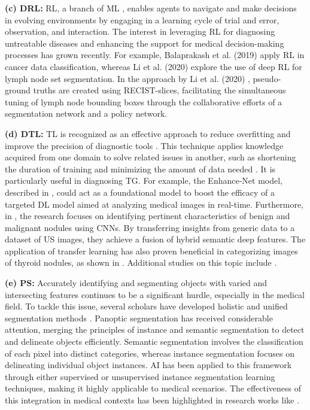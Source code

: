 \documentclass[a4paper,fleqn]{cas-sc}
\begin{document}
\vskip2mm
\noindent \textbf{(c) \Acf{DRL}: } \ac{RL}, a branch of \ac{ML} \cite{gueriani2023deep}, enables agents to navigate and make decisions in evolving environments by engaging in a learning cycle of trial and error, observation, and interaction. The interest in leveraging \ac{RL} for diagnosing untreatable diseases and enhancing the support for medical decision-making processes has grown recently. For example, Balaprakash et al. (2019) \cite{balaprakash2019scalable} apply \ac{RL} in cancer data classification, whereas Li et al. (2020) \cite{li2020deep} explore the use of deep \ac{RL} for lymph node set segmentation. In the approach by Li et al. (2020) \cite{li2020deep}, pseudo-ground truths are created using RECIST-slices, facilitating the simultaneous tuning of lymph node bounding boxes through the collaborative efforts of a segmentation network and a policy network.


\vskip2mm
\noindent \textbf{(d) \Acf{DTL}: }
\ac{TL} is recognized as an effective approach to reduce overfitting and improve the precision of diagnostic tools \cite{kerdjidj2023uncovering,kheddar2023deepIDS,himeur2023video}. This technique applies knowledge acquired from one domain to solve related issues in another, such as shortening the duration of training and minimizing the amount of data needed \cite{kheddar2023deep,sayed2023time}. It is particularly useful in diagnosing \ac{TG}. For example, the Enhance-Net model, described in \cite{narayan2023enhance}, could act as a foundational model to boost the efficacy of a targeted \ac{DL} model aimed at analyzing medical images in real-time. Furthermore, in \cite{liu2017classification}, the research focuses on identifying pertinent characteristics of benign and malignant nodules using \acp{CNN}. By transferring insights from generic data to a dataset of \ac{US} images, they achieve a fusion of hybrid semantic deep features. The application of transfer learning has also proven beneficial in categorizing images of thyroid nodules, as shown in \cite{song2019ultrasound}. Additional studies on this topic include \cite{yu2020lymph,kwon2020ultrasonographic, wang2019using,ma2019thyroid,sundar2018exploring}.

\vskip2mm
\noindent \textbf{(e) \Acf{PS}: } Accurately identifying and segmenting objects with varied and intersecting features continues to be a significant hurdle, especially in the medical field. To tackle this issue, several scholars have developed holistic and unified segmentation methods \cite{liu2019nuclei,elharrouss2021panoptic}. Panoptic segmentation has received considerable attention, merging the principles of instance and semantic segmentation to detect and delineate objects efficiently. Semantic segmentation involves the classification of each pixel into distinct categories, whereas instance segmentation focuses on delineating individual object instances. \ac{AI} has been applied to this framework through either supervised or unsupervised instance segmentation learning techniques, making it highly applicable to medical scenarios. The effectiveness of this integration in medical contexts has been highlighted in research works like \cite{yu2020deep,cai2020panoptic}.
\end{document}
